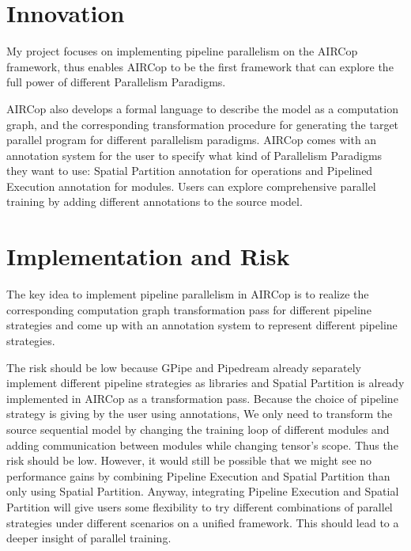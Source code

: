 \documentclass[sigplan]{acmart}\settopmatter{printfolios=true,printccs=false,printacmref=false}
\begin{document}
\section{Innovation}
My project focuses on implementing pipeline parallelism on the AIRCop framework, thus enables AIRCop to be the first framework that can explore the full power of different Parallelism Paradigms. \par
 AIRCop also develops a formal language to describe the model as a computation graph, and the corresponding transformation procedure for generating the target parallel program for different parallelism paradigms. AIRCop comes with an annotation system for the user to specify what kind of Parallelism Paradigms they want to use: Spatial Partition annotation for operations and Pipelined Execution annotation for modules. Users can explore comprehensive parallel training by adding different annotations to the source model.
 \section{Implementation and Risk}
 The key idea to implement pipeline parallelism in AIRCop is to realize the corresponding computation graph transformation pass for different pipeline strategies and come up with an annotation system to represent different pipeline strategies.\par
 The risk should be low because GPipe and Pipedream already separately implement different pipeline strategies as libraries and Spatial Partition is already implemented in AIRCop as a transformation pass. Because the choice of pipeline strategy is giving by the user using annotations, We only need to transform the source sequential model by changing the training loop of different modules and adding communication between modules while changing tensor's scope. Thus the risk should be low. However, it would still be possible that we might see no performance gains by combining Pipeline Execution and Spatial Partition than only using Spatial Partition. Anyway, integrating Pipeline Execution and Spatial Partition will give users some flexibility to try different combinations of parallel strategies under different scenarios on a unified framework. This should lead to a deeper insight of parallel training.
\end{document}
